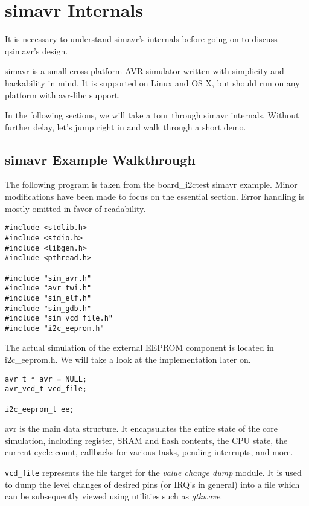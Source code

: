 
\chapter{simavr Internals} \label{chapter:simavr}

It is necessary to understand simavr's internals before going on to discuss
qsimavr's design.

simavr is a small cross-platform AVR simulator written with simplicity and
hackability in mind. It is supported on Linux and OS X, but should run on any
platform with avr-libc support.

In the following sections, we will take a tour through simavr internals.
Without further delay, let's jump right in and walk through a short demo.

\section{simavr Example Walkthrough}

The following program is taken from the board\_i2ctest simavr example. Minor
modifications have been made to focus on the essential section. Error handling
is mostly omitted in favor of readability.

\begin{lstlisting}
#include <stdlib.h>
#include <stdio.h>
#include <libgen.h>
#include <pthread.h>

#include "sim_avr.h"
#include "avr_twi.h"
#include "sim_elf.h"
#include "sim_gdb.h"
#include "sim_vcd_file.h"
#include "i2c_eeprom.h"
\end{lstlisting}

The actual simulation of the external EEPROM component is located in
i2c\_eeprom.h. We will take a look at the implementation later on.

\begin{lstlisting}
avr_t * avr = NULL;
avr_vcd_t vcd_file;

i2c_eeprom_t ee;
\end{lstlisting}

avr is the main data structure. It encapsulates the entire state of the
core simulation, including register, SRAM and flash contents, the CPU state, the
current cycle count, callbacks for various tasks, pending interrupts, and more.

\lstinline|vcd_file| represents the file target for the \emph{value change dump} module. It
is used to dump the level changes of desired pins (or IRQ's in general) into a
file which can be subsequently viewed using utilities such as \emph{gtkwave}.

